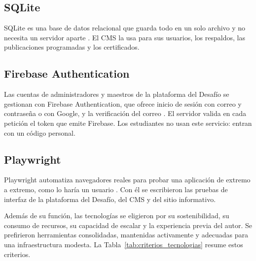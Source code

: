 \subsection{SQLite}

SQLite es una base de datos relacional que guarda todo en un solo archivo y no necesita un servidor aparte \parencite{sqlite}. El CMS la usa para sus usuarios, los respaldos, las publicaciones programadas y los certificados.

\subsection{Firebase Authentication}

Las cuentas de administradores y maestros de la plataforma del Desafío se gestionan con Firebase Authentication, que ofrece inicio de sesión con correo y contraseña o con Google, y la verificación del correo \parencite{firebaseauth}. El servidor valida en cada petición el token que emite Firebase. Los estudiantes no usan este servicio: entran con un código personal.

\subsection{Playwright}

Playwright automatiza navegadores reales para probar una aplicación de extremo a extremo, como lo haría un usuario \parencite{playwright}. Con él se escribieron las pruebas de interfaz de la plataforma del Desafío, del CMS y del sitio informativo.

Además de su función, las tecnologías se eligieron por su sostenibilidad, su consumo de recursos, su capacidad de escalar y la experiencia previa del autor. Se prefirieron herramientas consolidadas, mantenidas activamente y adecuadas para una infraestructura modesta. La Tabla~\ref{tab:criterios_tecnologias} resume estos criterios.

